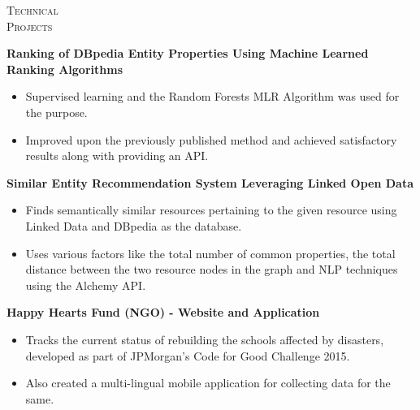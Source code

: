\documentclass[11pt,a4paper]{article}
\begin{document}
	\begin{minipage}[t]{0.2\textwidth}
		\textsc{Technical\\Projects} 
	\end{minipage}
	\begin{minipage}[t]{0.8\textwidth}
		\justify
		\textbf{Ranking of DBpedia Entity Properties Using Machine Learned Ranking Algorithms}
		\begin{itemize}[noitemsep, leftmargin=*, topsep=0pt]
			\item Supervised learning and the Random Forests MLR Algorithm was used for the purpose.
			\item Improved upon the previously published method	and achieved satisfactory results along with providing an API.
		\end{itemize}
		
		\justify
		\textbf{Similar Entity Recommendation System Leveraging Linked Open Data}
		\begin{itemize}[noitemsep, leftmargin=*, topsep=0pt]
			\item Finds semantically similar resources pertaining to the given resource using Linked Data and DBpedia as
			the database.
			\item Uses various factors like the total number of common properties, the total distance between the
			two resource nodes in the graph and NLP techniques using the Alchemy API.
		\end{itemize}
		
		\justify
		\textbf{Happy Hearts Fund (NGO) - Website and Application}
		\begin{itemize}[noitemsep, leftmargin=*, topsep=0pt]
			\item Tracks the current status of rebuilding the schools affected by disasters, developed as part of JPMorgan's Code for Good Challenge 2015.
			\item Also created a multi-lingual mobile application for collecting data for the same.
		\end{itemize}
		
	\end{minipage}
	\begin{minipage}[t]{0.2\textwidth}
		\textsc{ } %
	\end{minipage}
\end{document}
